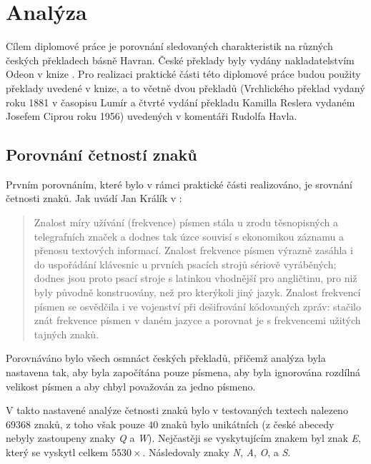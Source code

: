 \documentclass[dp.tex]{subfiles}
\begin{document}
\chapter{Analýza}
\label{chap:experiment} 

Cílem diplomové práce je porovnání sledovaných charakteristik na různých českých překladech básně Havran. České překlady byly vydány nakladatelstvím Odeon v knize . Pro realizaci praktické části této diplomové práce budou použity překlady uvedené v knize, a to včetně dvou překladů (Vrchlického překlad vydaný roku 1881 v časopisu Lumír a čtvrté vydání překladu Kamilla Reslera vydaném Josefem Ciprou roku 1956) uvedených v komentáři Rudolfa Havla.

\section{Porovnání četností znaků}

Prvním porovnáním, které bylo v rámci praktické části realizováno, je srovnání četnosti znaků. Jak uvádí Jan Králík v \cite[str.~109]{Tesitelova1987}: 

\begin{quote}
Znalost míry užívání (frekvence) písmen stála u zrodu těsnopisných a telegrafních značek a dodnes tak úzce souvisí s ekonomikou záznamu a přenosu textových informací. Znalost frekvence písmen výrazně zasáhla i do uspořádání klávesnic u prvních psacích strojů sériově vyráběných; dodnes jsou proto psací stroje s latinkou vhodnější pro angličtinu, pro niž byly původně konstruovány, než pro kterýkoli jiný jazyk. Znalost frekvencí písmen se osvědčila i ve vojenství při dešifrování kódovaných zpráv: stačilo znát frekvence písmen v daném jazyce a porovnat je s frekvencemi užitých \clq tajných znaků\crq.
\end{quote}

Porovnáváno bylo všech osmnáct českých překladů, přičemž analýza byla nastavena tak, aby byla započítána pouze písmena, aby byla ignorována rozdílná velikost písmen a aby  \clq ch\crq byl považován za jedno písmeno.

V takto nastavené analýze četnosti znaků bylo v testovaných textech nalezeno $69 368$ znaků, z toho však pouze $40$ znaků bylo unikátních (z české abecedy nebyly zastoupeny znaky \textit{Q} a \textit{W}). Nejčastěji se vyskytujícím znakem byl znak \textit{E}, který se vyskytl celkem $5530\times$. Následovaly znaky \textit{N}, \textit{A}, \textit{O}, a \textit{S}.
\end{document}
